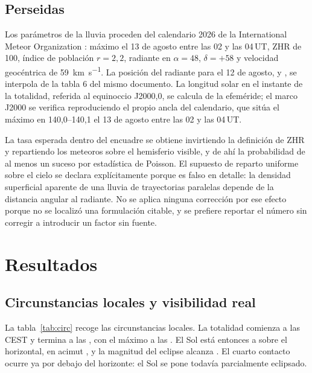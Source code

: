 \documentclass[10pt,a4paper]{article}
\begin{document}
\subsection{Perseidas}

Los parámetros de la lluvia proceden del calendario 2026 de la International
Meteor Organization \cite{imo2026}: máximo el 13 de agosto entre las 02 y las
04\,UT, ZHR de 100, índice de población $r = 2{,}2$, radiante en
$\alpha = 48$\textdegree, $\delta = +58$\textdegree{} y velocidad geocéntrica de
59~\si{\kilo\meter\per\second}. La posición del radiante para el 12 de agosto,
\radiantRA\textdegree{} y \radiantDec\textdegree, se interpola de la tabla 6 del
mismo documento. La longitud solar en el instante de la totalidad,
\lamSun\textdegree{} referida al equinoccio J2000,0, se calcula de la efeméride;
el marco J2000 se verifica reproduciendo el propio ancla del calendario, que
sitúa el máximo en 140,0--140,1\textdegree{} el 13 de agosto entre las 02 y las
04\,UT.

La tasa esperada dentro del encuadre se obtiene invirtiendo la definición de ZHR
y repartiendo los meteoros sobre el hemisferio visible, y de ahí la probabilidad
de al menos un suceso por estadística de Poisson. El supuesto de reparto
uniforme sobre el cielo se declara explícitamente porque es falso en detalle:
la densidad superficial aparente de una lluvia de trayectorias paralelas depende
de la distancia angular al radiante. No se aplica ninguna corrección por ese
efecto porque no se localizó una formulación citable, y se prefiere reportar el
número sin corregir a introducir un factor sin fuente.

\section{Resultados}

\subsection{Circunstancias locales y visibilidad real}

La tabla~\ref{tab:circ} recoge las circunstancias locales. La totalidad comienza
a las \localCTwo CEST y termina a las \localCThree, con el máximo a las
\localMax. El Sol está entonces a \altMax\textdegree{} sobre el horizontal, en
acimut \azMax\textdegree, y la magnitud del eclipse alcanza \magMax. El cuarto
contacto ocurre ya por debajo del horizonte: el Sol se pone todavía
parcialmente eclipsado.
\end{document}
